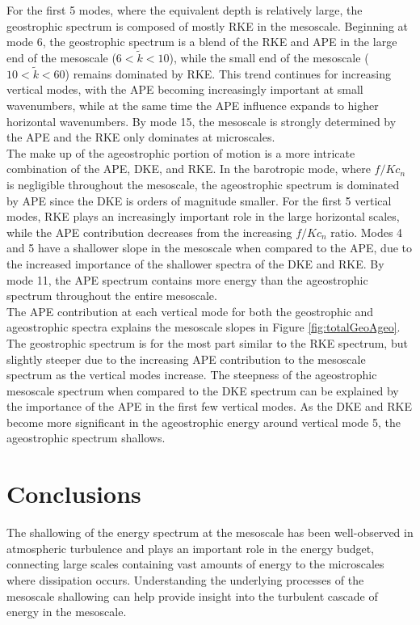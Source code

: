 For the first 5 modes, where the equivalent depth is relatively large, the geostrophic spectrum is composed of mostly RKE in the mesoscale. Beginning at mode 6, the geostrophic spectrum is a blend of the RKE and APE in the large end of the mesoscale ($6 < \tilde{k} < 10$), while the small end of the mesoscale ($10 < \tilde{k} < 60$) remains dominated by RKE. This trend continues for increasing vertical modes, with the APE becoming increasingly important at small wavenumbers, while at the same time the APE influence expands to higher horizontal wavenumbers. By mode 15, the mesoscale is strongly determined by the APE and the RKE only dominates at microscales.\\

The make up of the ageostrophic portion of motion is a more intricate combination of the APE, DKE, and RKE. In the barotropic mode, where $f/Kc_n$ is negligible throughout the mesoscale, the ageostrophic spectrum is dominated by APE since the DKE is orders of magnitude smaller. For the first 5 vertical modes, RKE plays an increasingly important role in the large horizontal scales, while the APE contribution decreases from the increasing $f/Kc_n$ ratio. Modes 4 and 5 have a shallower slope in the mesoscale when compared to the APE, due to the increased importance of the shallower spectra of the DKE and RKE. By mode 11, the APE spectrum contains more energy than the ageostrophic spectrum throughout the entire mesoscale. \\

The APE contribution at each vertical mode for both the geostrophic and ageostrophic spectra explains the mesoscale slopes in Figure \ref{fig:totalGeoAgeo}. The geostrophic spectrum is for the most part similar to the RKE spectrum, but slightly steeper due to the increasing APE contribution to the mesoscale spectrum as the vertical modes increase. The steepness of the ageostrophic mesoscale spectrum when compared to the DKE spectrum can be explained by the importance of the APE in the first few vertical modes. As the DKE and RKE become more significant in the ageostrophic energy around vertical mode 5, the ageostrophic spectrum shallows.
\newpage
\section{Conclusions}
The shallowing of the energy spectrum at the mesoscale has been well-observed in atmospheric turbulence and plays an important role in the energy budget, connecting large scales containing vast amounts of energy to the microscales where dissipation occurs. Understanding the underlying processes of the mesoscale shallowing can help provide insight into the turbulent cascade of energy in the mesoscale.\\


